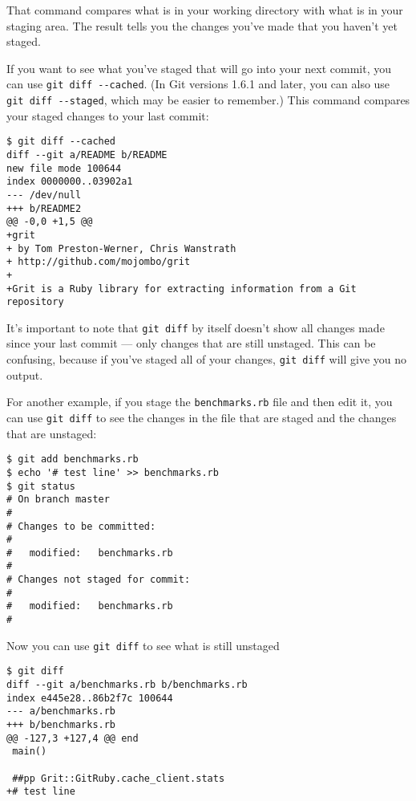 \documentclass[a4paper]{book}
\begin{document}
That command compares what is in your working directory with what is in your staging area. The result tells you the changes you've made that you haven't yet staged.

If you want to see what you've staged that will go into your next commit, you can use \texttt{git diff -{}-cached}. (In Git versions 1.6.1 and later, you can also use \texttt{git diff -{}-staged}, which may be easier to remember.) This command compares your staged changes to your last commit:

\begin{shaded}\begin{verbatim}
$ git diff --cached
diff --git a/README b/README
new file mode 100644
index 0000000..03902a1
--- /dev/null
+++ b/README2
@@ -0,0 +1,5 @@
+grit
+ by Tom Preston-Werner, Chris Wanstrath
+ http://github.com/mojombo/grit
+
+Grit is a Ruby library for extracting information from a Git repository
\end{verbatim}\end{shaded}

It's important to note that \texttt{git diff} by itself doesn't show all changes made since your last commit --- only changes that are still unstaged. This can be confusing, because if you've staged all of your changes, \texttt{git diff} will give you no output.

For another example, if you stage the \texttt{benchmarks.rb} file and then edit it, you can use \texttt{git diff} to see the changes in the file that are staged and the changes that are unstaged:

\begin{shaded}\begin{verbatim}
$ git add benchmarks.rb
$ echo '# test line' >> benchmarks.rb
$ git status
# On branch master
#
# Changes to be committed:
#
#	modified:   benchmarks.rb
#
# Changes not staged for commit:
#
#	modified:   benchmarks.rb
#
\end{verbatim}\end{shaded}

Now you can use \texttt{git diff} to see what is still unstaged

\begin{shaded}\begin{verbatim}
$ git diff
diff --git a/benchmarks.rb b/benchmarks.rb
index e445e28..86b2f7c 100644
--- a/benchmarks.rb
+++ b/benchmarks.rb
@@ -127,3 +127,4 @@ end
 main()

 ##pp Grit::GitRuby.cache_client.stats
+# test line
\end{verbatim}\end{shaded}
\end{document}
